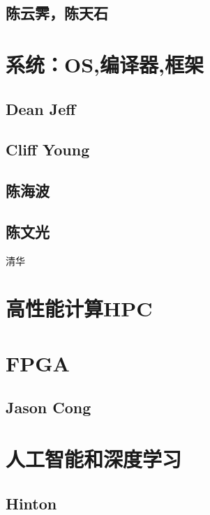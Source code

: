 \subsection{陈云霁，陈天石}


\section{系统：OS,编译器,框架}

\subsection{Dean Jeff}

\subsection{Cliff Young}

\subsection{}

\subsection{陈海波}

\subsection{陈文光}
清华


\section{高性能计算HPC}



\section{FPGA }

\subsection{Jason Cong }

\section{人工智能和深度学习}

\subsection{Hinton}

